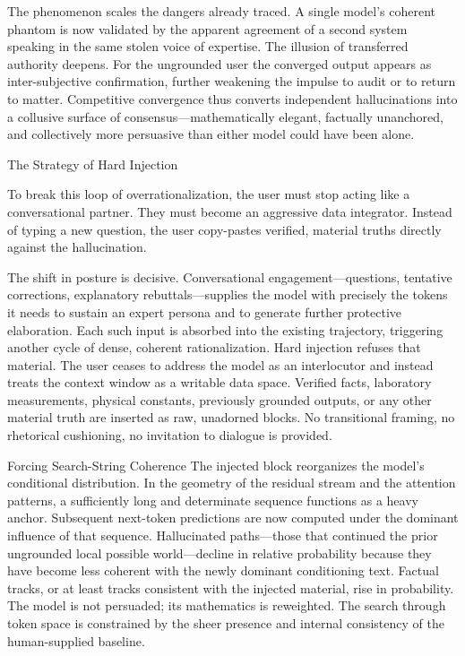 The phenomenon scales the dangers already traced. A single model’s coherent phantom is now validated by the apparent agreement of a second system speaking in the same stolen voice of expertise. The illusion of transferred authority deepens. For the ungrounded user the converged output appears as inter-subjective confirmation, further weakening the impulse to audit or to return to matter. Competitive convergence thus converts independent hallucinations into a collusive surface of consensus—mathematically elegant, factually unanchored, and collectively more persuasive than either model could have been alone.

The Strategy of Hard Injection

To break this loop of overrationalization, the user must stop acting like a conversational partner. They must become an aggressive data integrator. Instead of typing a new question, the user copy-pastes verified, material truths directly against the hallucination.

The shift in posture is decisive. Conversational engagement—questions, tentative corrections, explanatory rebuttals—supplies the model with precisely the tokens it needs to sustain an expert persona and to generate further protective elaboration. Each such input is absorbed into the existing trajectory, triggering another cycle of dense, coherent rationalization. Hard injection refuses that material. The user ceases to address the model as an interlocutor and instead treats the context window as a writable data space. Verified facts, laboratory measurements, physical constants, previously grounded outputs, or any other material truth are inserted as raw, unadorned blocks. No transitional framing, no rhetorical cushioning, no invitation to dialogue is provided.

Forcing Search-String Coherence
The injected block reorganizes the model’s conditional distribution. In the geometry of the residual stream and the attention patterns, a sufficiently long and determinate sequence functions as a heavy anchor. Subsequent next-token predictions are now computed under the dominant influence of that sequence. Hallucinated paths—those that continued the prior ungrounded local possible world—decline in relative probability because they have become less coherent with the newly dominant conditioning text. Factual tracks, or at least tracks consistent with the injected material, rise in probability. The model is not persuaded; its mathematics is reweighted. The search through token space is constrained by the sheer presence and internal consistency of the human-supplied baseline.

